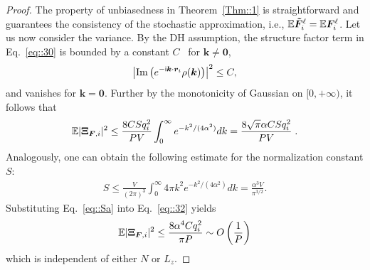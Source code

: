 \begin{proof}%
    The property of unbiasedness in Theorem~\ref{Thm::1} is straightforward and guarantees the consistency of the stochastic approximation, i.e., $\mathbb{E}\boldsymbol{ \tilde{F}}_i^{\ell}=\mathbb{E}\boldsymbol{F}_i^{\ell}$. 
    Let us now consider the variance.
    By the DH assumption, the structure factor term in Eq.~\eqref{eq::30} is bounded by a constant $C$~\cite{jin2021random} for $\bm{k}\neq \bm{0}$,
    \begin{equation}
        \left|\text{Im}\left(e^{-\mathsf i \boldsymbol{k}\cdot \boldsymbol{r}_i}\rho(\boldsymbol{k})\right)\right|^2\leq C,
    \end{equation}
    and vanishes for $\bm{k}=\bm{0}$. 
    Further by the monotonicity of Gaussian on $[0, +\infty )$, it follows that
    \begin{equation}\label{eq::32}
        \begin{split}
            \mathbb{E}|\V \Xi_{\V F,i}|^2\leq \frac{8 CSq_i^2}{PV}\int_{0}^{\infty}e^{-k^2/(4\alpha^2)}dk= \frac{8\sqrt{\pi}\alpha CSq_i^2}{PV}\;.%
        \end{split}
    \end{equation}
    Analogously, one can obtain the following estimate for the normalization constant $S$:
    \begin{equation}\label{eq::Sa}
        \begin{split}
            S\leq \frac{V}{(2\pi)^3}\int_{0}^{\infty}4\pi k^2e^{-k^2/(4\alpha^2)}dk=\frac{\alpha^3V}{\pi^{3/2}}.
        \end{split}
    \end{equation}
    Substituting Eq.~\eqref{eq::Sa} into Eq.~\eqref{eq::32} yields
    \begin{equation}
        \mathbb{E}|\boldsymbol{\Xi}_{\boldsymbol{F},i}|^2\leq\frac{8\alpha^4Cq_i^2}{\pi P}\sim O\left(\frac{1}{P}\right)
    \end{equation}
    which is independent of either $N$ or $L_z$.
\end{proof}

